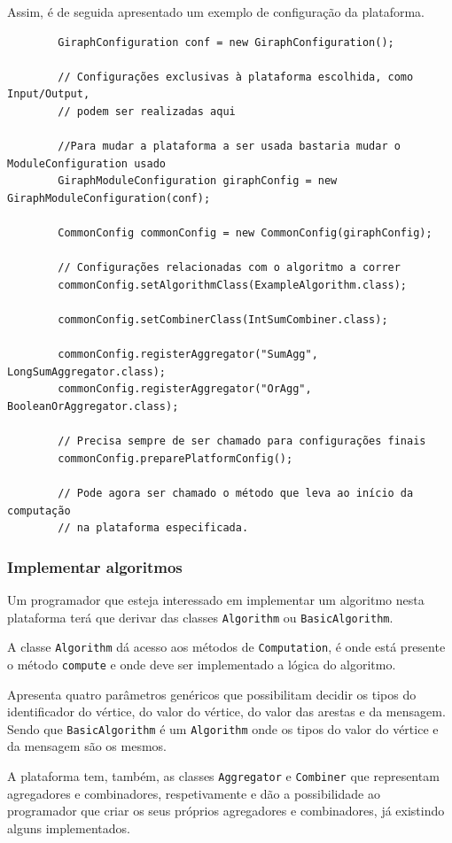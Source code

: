 Assim, é de seguida apresentado um exemplo de configuração da plataforma.

\begin{verbatim}
		GiraphConfiguration conf = new GiraphConfiguration();

		// Configurações exclusivas à plataforma escolhida, como Input/Output, 
		// podem ser realizadas aqui
		
		//Para mudar a plataforma a ser usada bastaria mudar o ModuleConfiguration usado
		GiraphModuleConfiguration giraphConfig = new GiraphModuleConfiguration(conf);
		
		CommonConfig commonConfig = new CommonConfig(giraphConfig);
		
		// Configurações relacionadas com o algoritmo a correr
		commonConfig.setAlgorithmClass(ExampleAlgorithm.class);
		
		commonConfig.setCombinerClass(IntSumCombiner.class);
		
		commonConfig.registerAggregator("SumAgg", LongSumAggregator.class);
		commonConfig.registerAggregator("OrAgg", BooleanOrAggregator.class);
		
		// Precisa sempre de ser chamado para configurações finais
		commonConfig.preparePlatformConfig();
		
		// Pode agora ser chamado o método que leva ao início da computação
		// na plataforma especificada.
\end{verbatim}

\subsubsection*{Implementar algoritmos}
Um programador que esteja interessado em implementar um algoritmo nesta plataforma terá que derivar das classes \texttt{Algorithm} ou \texttt{BasicAlgorithm}.

A classe \texttt{Algorithm} dá acesso aos métodos de \texttt{Computation}, é onde está presente o método \texttt{compute} e onde deve ser implementado a lógica do algoritmo.

Apresenta quatro parâmetros genéricos que possibilitam decidir os tipos do identificador do vértice, do valor do vértice, do valor das arestas e da mensagem. Sendo que \texttt{BasicAlgorithm} é um \texttt{Algorithm} onde os tipos do valor do vértice e da mensagem são os mesmos.

A plataforma tem, também, as classes \texttt{Aggregator} e \texttt{Combiner} que representam agregadores e combinadores, respetivamente e dão a possibilidade ao programador que criar os seus próprios agregadores e combinadores, já existindo alguns implementados.


